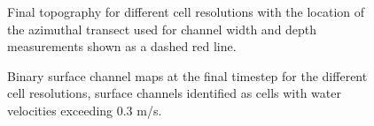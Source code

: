 \begin{figure}[!ht]
	\caption{Final topography for different cell resolutions with the location of the azimuthal transect used for channel width and depth measurements shown as a dashed red line.}
	\label{fig:res_finaltopo}
\end{figure}

\begin{figure}[!ht]
	\caption{Binary surface channel maps at the final timestep for the different cell resolutions, surface channels identified as cells with water velocities exceeding 0.3 m/s.}
	\label{fig:res_chanmap}
\end{figure}

